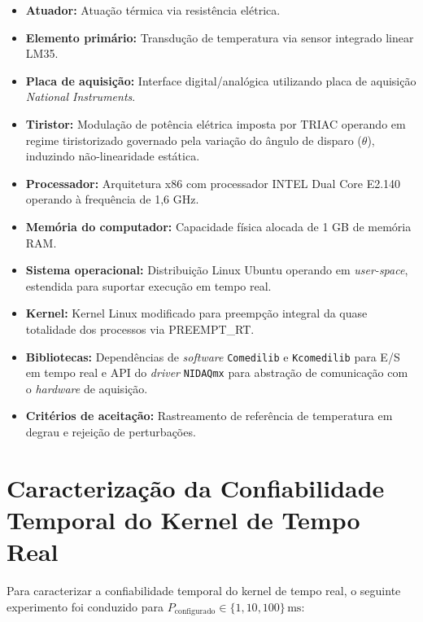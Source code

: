 \documentclass[conference,harvard,brazil,english]{sbatex}
\begin{document}
\begin{itemize}
    \item \textbf{Atuador:} Atuação térmica via resistência elétrica.
    \item \textbf{Elemento primário:} Transdução de temperatura via sensor integrado linear LM35.
    \item \textbf{Placa de aquisição:} Interface digital/analógica utilizando placa de aquisição \textit{National Instruments}.
    \item \textbf{Tiristor:} Modulação de potência elétrica imposta por TRIAC operando em regime tiristorizado governado pela variação do ângulo de disparo ($\theta$), induzindo não-linearidade estática.
    \item \textbf{Processador:} Arquitetura x86 com processador INTEL Dual Core E2.140 operando à frequência de 1,6 GHz.
    \item \textbf{Memória do computador:} Capacidade física alocada de 1 GB de memória RAM.
    \item \textbf{Sistema operacional:} Distribuição Linux Ubuntu operando em \textit{user-space}, estendida para suportar execução em tempo real.
    \item \textbf{Kernel:} Kernel Linux modificado para preempção integral da quase totalidade dos processos via PREEMPT\_RT.
    \item \textbf{Bibliotecas:} Dependências de \textit{software} \texttt{Comedilib} e \texttt{Kcomedilib} para E/S em tempo real e API do \textit{driver} \texttt{NIDAQmx} para abstração de comunicação com o \textit{hardware} de aquisição.
    \item \textbf{Critérios de aceitação:} Rastreamento de referência de temperatura em degrau e rejeição de perturbações.
\end{itemize}

\section{Caracterização da Confiabilidade Temporal do Kernel de Tempo Real}\label{sec:caracterizacao}

Para caracterizar a confiabilidade temporal do kernel de tempo real, o seguinte experimento foi conduzido para $P_\text{configurado} \in \{1,10,100\}\,\text{ms}$:
\end{document}
